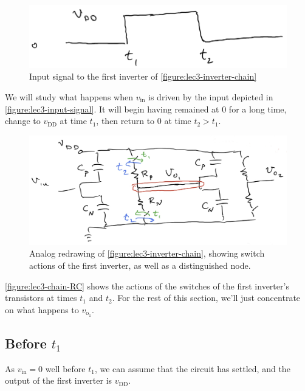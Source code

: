 \begin{figure}
  \centering
  \includegraphics[width=0.75\linewidth]{figures/3/input-signal}
  \caption{Input signal to the first inverter of \autoref{figure:lec3-inverter-chain}}
  \label{figure:lec3-input-signal}
\end{figure}
We will study what happens when \(v_\text{in}\) is driven by the input depicted in \autoref{figure:lec3-input-signal}. It will begin having remained at 0 for a long time, change to \(v_\text{DD}\) at time \(t_1\), then return to \(0\) at time \(t_2 > t_1\).
\begin{figure}
  \centering
  \includegraphics[width=1\linewidth]{figures/3/chain-RC}
  \caption{Analog redrawing of \autoref{figure:lec3-inverter-chain}, showing switch actions of the first inverter, as well as a distinguished node.}
  \label{figure:lec3-chain-RC}
\end{figure}
\autoref{figure:lec3-chain-RC} shows the actions of the switches of the first inverter's transistors at times \(t_1\) and \(t_2\).
For the rest of this section, we'll just concentrate on what happens to \(v_{\text{o}_1}\).

\subsection{Before \(t_1\)}
As \(v_\text{in} = 0\) well before \(t_1\), we can assume that the circuit has settled, and the output of the first inverter is \(v_\text{DD}\).

